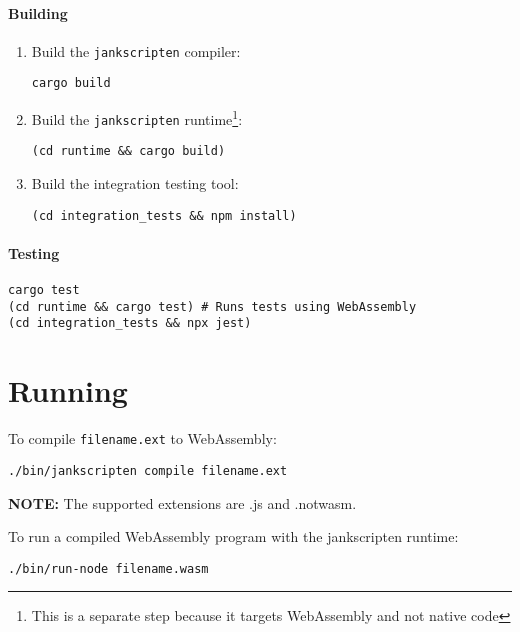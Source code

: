 \documentclass{book}
\newcommand{\system}{\texttt{jankscripten}\xspace}
\begin{document}
\paragraph{Building}

\begin{enumerate}

\item Build the \system compiler:
\begin{verbatim}
cargo build
\end{verbatim}

\item Build the \system runtime\footnote{This is a separate step because it
targets WebAssembly and not native code}:
\begin{verbatim}
(cd runtime && cargo build)
\end{verbatim}

\item Build the integration testing tool:
\begin{verbatim}
(cd integration_tests && npm install)
\end{verbatim}

\end{enumerate}

\paragraph{Testing}

\begin{verbatim}
cargo test
(cd runtime && cargo test) # Runs tests using WebAssembly
(cd integration_tests && npx jest)
\end{verbatim}

\section{Running}
    
To compile \texttt{filename.ext} to WebAssembly:

\begin{verbatim}
./bin/jankscripten compile filename.ext
\end{verbatim}

\textbf{NOTE:} The supported extensions are .js and .notwasm.

To run a compiled WebAssembly program with the jankscripten runtime:

\begin{verbatim}
./bin/run-node filename.wasm
\end{verbatim}
\end{document}
